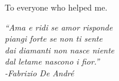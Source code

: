\documentclass[10pt, a4paper, twoside, onpenany]{report}
\begin{document}
	To everyone who helped me.
	\vspace*{2.0cm}
	\begin{flushright}
		\textit{“Ama e ridi se amor risponde\\piangi forte se non ti sente\\dai diamanti non nasce niente\\dal letame nascono i fior.”\\-Fabrizio De André}
	\end{flushright}

	
	
	\tableofcontents
		
	
	
	
	
	
	
	
	
	
	
	
	
	
	
	
	
	
	
\end{document}
